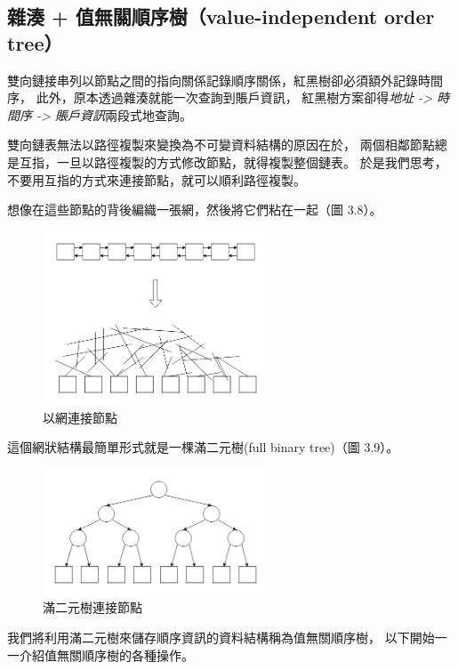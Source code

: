 \subsection{雜湊 + 值無關順序樹（value-independent order tree）}

雙向鏈接串列以節點之間的指向關係記錄順序關係，紅黑樹卻必須額外記錄時間序，
此外，原本透過雜湊就能一次查詢到賬戶資訊，
紅黑樹方案卻得\emph{地址 -> 時間序 -> 賬戶資訊}兩段式地查詢。

雙向鏈表無法以路徑複製來變換為不可變資料結構的原因在於，
兩個相鄰節點總是互指，一旦以路徑複製的方式修改節點，就得複製整個鏈表。
於是我們思考，不要用互指的方式來連接節點，就可以順利路徑複製。

想像在這些節點的背後編織一張網，然後將它們粘在一起（圖 3.8）。

\begin{figure}[ht]
\centerline{\includegraphics[width=0.6\textwidth]{節點網}}
\caption{以網連接節點}
\end{figure}

這個網狀結構最簡單形式就是一棵滿二元樹(full binary tree)（圖 3.9）。

\begin{figure}[ht]
\centerline{\includegraphics[width=0.6\textwidth]{滿二元樹}}
\caption{滿二元樹連接節點}
\end{figure}

我們將利用滿二元樹來儲存順序資訊的資料結構稱為值無關順序樹，
以下開始一一介紹值無關順序樹的各種操作。

